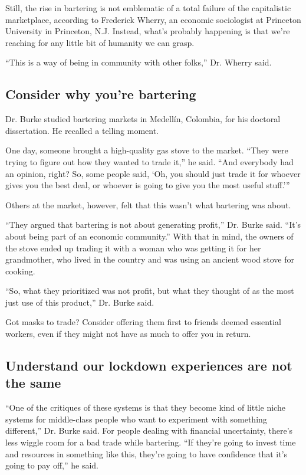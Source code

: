 Still, the rise in bartering is not emblematic of a total failure of the
capitalistic marketplace, according to Frederick Wherry, an economic
sociologist at Princeton University in Princeton, N.J. Instead, what's
probably happening is that we're reaching for any little bit of humanity
we can grasp.

``This is a way of being in community with other folks,'' Dr. Wherry
said.

\hypertarget{consider-why-youre-bartering}{%
\subsection{Consider why you're
bartering}\label{consider-why-youre-bartering}}

Dr. Burke studied bartering markets in Medellín, Colombia, for his
doctoral dissertation. He recalled a telling moment.

One day, someone brought a high-quality gas stove to the market. ``They
were trying to figure out how they wanted to trade it,'' he said. ``And
everybody had an opinion, right? So, some people said, `Oh, you should
just trade it for whoever gives you the best deal, or whoever is going
to give you the most useful stuff.'''

Others at the market, however, felt that this wasn't what bartering was
about.

``They argued that bartering is not about generating profit,'' Dr. Burke
said. ``It's about being part of an economic community.'' With that in
mind, the owners of the stove ended up trading it with a woman who was
getting it for her grandmother, who lived in the country and was using
an ancient wood stove for cooking.

``So, what they prioritized was not profit, but what they thought of as
the most just use of this product,'' Dr. Burke said.

Got masks to trade? Consider offering them first to friends deemed
essential workers, even if they might not have as much to offer you in
return.

\hypertarget{understand-our-lockdown-experiences-are-not-the-same}{%
\subsection{Understand our lockdown experiences are not the
same}\label{understand-our-lockdown-experiences-are-not-the-same}}

``One of the critiques of these systems is that they become kind of
little niche systems for middle-class people who want to experiment with
something different,'' Dr. Burke said. For people dealing with financial
uncertainty, there's less wiggle room for a bad trade while bartering.
``If they're going to invest time and resources in something like this,
they're going to have confidence that it's going to pay off,'' he said.

